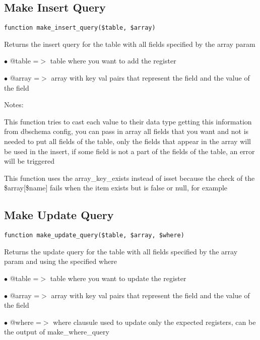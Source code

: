 \documentclass[a4paper]{book}
\begin{document}
\hypertarget{toc258}{}
\subsection{Make Insert Query}

\begin{lstlisting}
function make_insert_query($table, $array)
\end{lstlisting}

Returns the insert query for the table with all fields specified by the
array param

\begin{compactitem}
\item[\color{myblue}$\bullet$] @table =$>$ table where you want to add the register
\item[\color{myblue}$\bullet$] @array =$>$ array with key val pairs that represent the field and the value
          of the field
\end{compactitem}

Notes:

This function tries to cast each value to their data type getting this
information from dbschema config, you can pass in array all fields that
you want and not is needed to put all fields of the table, only the
fields that appear in the array will be used in the insert, if some
field is not a part of the fields of the table, an error will be
triggered

This function uses the array\_key\_exists instead of isset because the
check of the \$array[\$name] fails when the item exists but is false or
null, for example

\hypertarget{toc259}{}
\subsection{Make Update Query}

\begin{lstlisting}
function make_update_query($table, $array, $where)
\end{lstlisting}

Returns the update query for the table with all fields specified by the
array param and using the specified where

\begin{compactitem}
\item[\color{myblue}$\bullet$] @table =$>$ table where you want to update the register
\item[\color{myblue}$\bullet$] @array =$>$ array with key val pairs that represent the field and the value of
          the field
\item[\color{myblue}$\bullet$] @where =$>$ where clausule used to update only the expected registers, can be
          the output of make\_where\_query
\end{compactitem}
\end{document}

